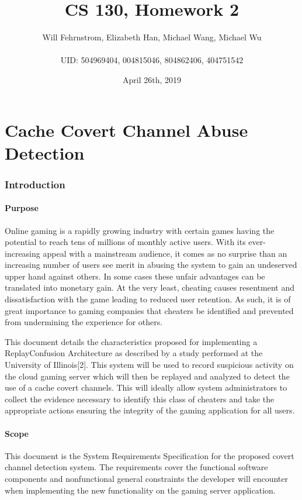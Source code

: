 \documentclass[12pt]{article}
\title{CS 130, Homework 2}
\author{Will Fehrnstrom, Elizabeth Han, Michael Wang, Michael Wu\\
\\
UID: 504969404, 004815046, 804862406, 404751542}
\date{April 26th, 2019}
\begin{document}
\maketitle
\part{Cache Covert Channel Abuse Detection}

\section{Introduction}

\subsection{Purpose}

Online gaming is a rapidly growing industry with certain games having the potential to reach tens of
millions of monthly active users. With its ever-increasing appeal with a mainstream audience, it comes
as no surprise than an increasing number of users see merit in abusing the system to gain an undeserved
upper hand against others. In some cases these unfair advantages can be translated into monetary gain.
At the very least, cheating causes resentment and dissatisfaction with the game leading to reduced user
retention. As such, it is of great importance to gaming companies that cheaters be identified and prevented
from undermining the experience for others.

This document details the characteristics proposed for implementing a ReplayConfusion Architecture as
described by a study performed at the University of Illinois[2]. This system will be used to record
suspicious activity on the cloud gaming server which will then be replayed and analyzed to detect the
use of a cache covert channels. This will ideally allow system administrators to collect the evidence
necessary to identify this class of cheaters and take the appropriate actions ensuring the integrity of
the gaming application for all users.

\subsection{Scope}

This document is the System Requirements Specification for the proposed covert channel detection system.
The requirements cover the functional software components and nonfunctional general constraints the
developer will encounter when implementing the new functionality on the gaming server application.
\end{document}
